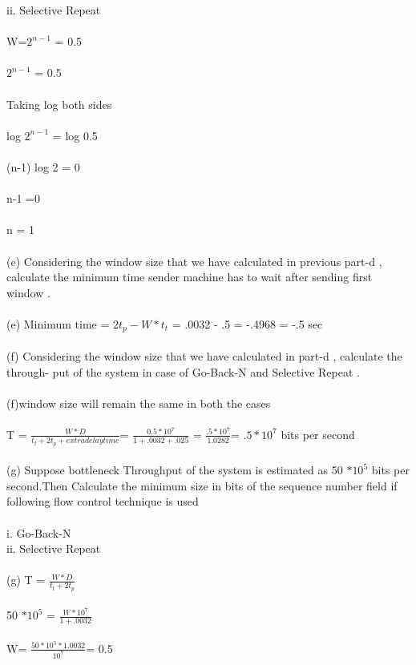 \documentclass[a4paper,12pt]{article}
\begin{document}
   ii. Selective Repeat \\\\
   W=$2^{n-1}$ = 0.5\\\\
   $2^{n-1}$ = 0.5 \\\\
   Taking log both sides \\\\
   log $2^{n-1}$ = log 0.5\\\\
   (n-1) log 2 = 0\\\\
   n-1 =0\\\\
   n = 1 \\\\
(e) Considering the window size that we have calculated in previous part-d , calculate
the minimum time sender machine has to wait after sending first window .\\\\
(e) Minimum time = $2t_{p}- W*t_{t}$ = .0032 - .5 = -.4968 = -.5 sec\\\\
(f) Considering the window size that we have calculated in part-d , calculate the through-
put of the system in case of Go-Back-N and Selective Repeat .\\\\
(f)window size will remain the same in both the cases\\\\
    T = $\frac{W*D}{t_{t}+2t_{p}+ extra delay time}$= $\frac{0.5* 10^7 }{1 +.0032 + .025}$ = $\frac{.5 * 10^7}{1.0282}$= $.5*10^7$ bits per second\\\\
(g) Suppose bottleneck Throughput of the system is estimated as 50 $* 10^5$ bits per
second.Then Calculate the minimum size in bits of the sequence number field if
following flow control technique is used\\\\
i. Go-Back-N\\
ii. Selective Repeat\\\\
(g) T = $\frac{W*D}{t_{t}+2t_{p}}$\\\\
   50 $* 10^5$    = $\frac{W*10^7}{1+.0032}$ \\\\
   W= $\frac{50* 10^5 * 1.0032}{10^7}$= 0.5\\\\
\end{document}
